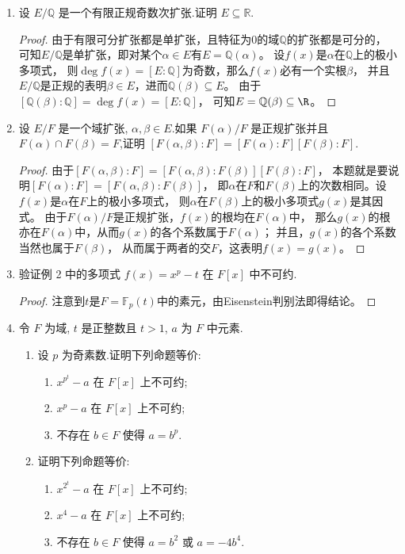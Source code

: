 \begin{enumerate}
\item 设 $ E/\mathbb{Q} $ 是一个有限正规奇数次扩张.证明 $ E \subseteq \mathbb{R} $.
\begin{proof}
    由于有限可分扩张都是单扩张，且特征为$0$的域$\mathbb{Q}$的扩张都是可分的，
    可知$E/\mathbb{Q}$是单扩张，即对某个$\alpha \in E$有$E=\mathbb{Q}(\alpha)$。
    设$f(x)$是$\alpha$在$\mathbb{Q}$上的极小多项式，
    则$\deg f(x)=[E:\mathbb{Q}]$为奇数，那么$f(x)$必有一个实根$\beta$，
    并且$E/\mathbb{Q}$是正规的表明$\beta \in E$，进而$\mathbb{Q}(\beta) \subseteq E$。
    由于$[\mathbb{Q}(\beta):\mathbb{Q}]=\deg f(x)=[E:\mathbb{Q}]$，
    可知$E=\mathbb{Q}(\beta)\subseteq\R$。
\end{proof}
\item 设 $ E/F $ 是一个域扩张, $ \alpha, \beta \in E $.如果 $ F(\alpha)/F $ 是正规扩张并且 $ F(\alpha) \cap F(\beta) = F $,证明 $ [F(\alpha, \beta) : F] = [F(\alpha) : F][F(\beta) : F] $.
\begin{proof}
    由于$[F(\alpha,\beta):F]=[F(\alpha,\beta):F(\beta)][F(\beta):F]$，
    本题就是要说明$[F(\alpha):F]=[F(\alpha,\beta):F(\beta)]$，
    即$\alpha$在$F$和$F(\beta)$上的次数相同。设$f(x)$是$\alpha$在$F$上的极小多项式，
    则$\alpha$在$F(\beta)$上的极小多项式$g(x)$是其因式。
    由于$F(\alpha)/F$是正规扩张，$f(x)$的根均在$F(\alpha)$中，
    那么$g(x)$的根亦在$F(\alpha)$中，从而$g(x)$的各个系数属于$F(\alpha)$；
    并且，$g(x)$的各个系数当然也属于$F(\beta)$，
    从而属于两者的交$F$，这表明$f(x)=g(x)$。
\end{proof}
\item 验证例 2 中的多项式 $ f(x) = x^p - t $ 在 $ F[x] $ 中不可约.
\begin{proof}
    注意到$t$是$F=\mathbb{F}_p(t)$中的素元，由Eisenstein判别法即得结论。
\end{proof}
\item 令 $ F $ 为域, $ t $ 是正整数且 $ t > 1$, $ a $ 为 $ F $ 中元素.
\begin{enumerate}[label=(\arabic*)]
    \item 设 $ p $ 为奇素数.证明下列命题等价:
    \begin{enumerate}[label=(\alph*)]
        \item $ x^{p^t} - a $ 在 $ F[x] $ 上不可约;
        \item $ x^p - a $ 在 $ F[x] $ 上不可约;
        \item 不存在 $ b \in F $ 使得 $ a = b^p $.
    \end{enumerate}
    
    \item 证明下列命题等价:
    \begin{enumerate}[label=(\alph*)]
        \item $ x^{2^t} - a $ 在 $ F[x] $ 上不可约;
        \item $ x^4 - a $ 在 $ F[x] $ 上不可约;
        \item 不存在 $ b \in F $ 使得 $ a = b^2 $ 或 $ a = -4b^4 $.
    \end{enumerate}
    

\end{enumerate}
\end{enumerate}
